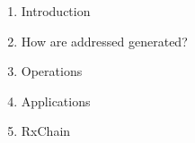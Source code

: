 \begin{enumerate}
  
  \item Introduction
    
    
  \item How are addressed generated?
    

\newpage
  \item Operations
    
    
  \item Applications
    

  \item RxChain
    

\end{enumerate}


